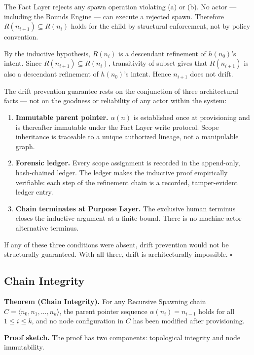 The Fact Layer rejects any spawn operation violating (a) or (b). No actor — including the Bounds Engine — can execute a rejected spawn. Therefore $R(n_{i+1}) \subseteq R(n_i)$ holds for the child by structural enforcement, not by policy convention.

By the inductive hypothesis, $R(n_i)$ is a descendant refinement of $h(n_0)$'s intent. Since $R(n_{i+1}) \subseteq R(n_i)$, transitivity of subset gives that $R(n_{i+1})$ is also a descendant refinement of $h(n_0)$'s intent. Hence $n_{i+1}$ does not drift.

\medskip
The drift prevention guarantee rests on the conjunction of three architectural facts — not on the goodness or reliability of any actor within the system:

\begin{enumerate}
    \item[(1)] \textbf{Immutable parent pointer.} $\alpha(n)$ is established once at provisioning and is thereafter immutable under the Fact Layer write protocol. Scope inheritance is traceable to a unique authorized lineage, not a manipulable graph.
    \item[(2)] \textbf{Forensic ledger.} Every scope assignment is recorded in the append-only, hash-chained ledger. The ledger makes the inductive proof empirically verifiable: each step of the refinement chain is a recorded, tamper-evident ledger entry.
    \item[(3)] \textbf{Chain terminates at Purpose Layer.} The exclusive human terminus closes the inductive argument at a finite bound. There is no machine-actor alternative terminus.
\end{enumerate}

If any of these three conditions were absent, drift prevention would not be structurally guaranteed. With all three, drift is architecturally impossible. $\square$

\subsection{Chain Integrity}
\label{sec:rs-chain-integrity-proof}

\medskip
\noindent\textbf{Theorem (Chain Integrity).} For any Recursive Spawning chain $C = \langle n_0, n_1, \ldots, n_k \rangle$, the parent pointer sequence $\alpha(n_i) = n_{i-1}$ holds for all $1 \leq i \leq k$, and no node configuration in $C$ has been modified after provisioning.

\medskip
\noindent\textbf{Proof sketch.} The proof has two components: topological integrity and node immutability.

